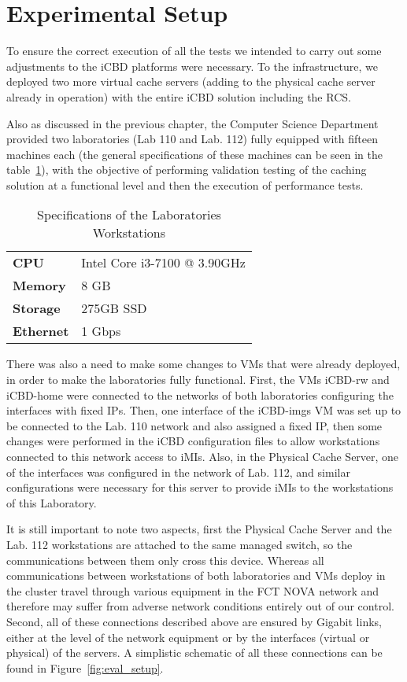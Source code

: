 \section{Experimental Setup}
\label{sec:eval_exp_setup}

To ensure the correct execution of all the tests we intended to carry out some adjustments to the iCBD platforms were necessary. To the infrastructure, we deployed two more virtual cache servers (adding to the physical cache server already in operation) with the entire iCBD solution including the RCS. 

Also as discussed in the previous chapter, the Computer Science Department provided two laboratories (Lab 110 and Lab. 112) fully equipped with fifteen machines each (the general specifications of these machines can be seen in the table~\ref{tab:exp_lab_work}), with the objective of performing validation testing of the caching solution at a functional level and then the execution of performance tests.

\begin{table}[]
\centering
\begin{tabular}{ll}
\textbf{CPU} & Intel Core i3-7100 @ 3.90GHz \\
\textbf{Memory} & 8 GB \\
\textbf{Storage} & 275GB SSD \\
\textbf{Ethernet} & 1 Gbps
\end{tabular}
\caption{Specifications of the Laboratories Workstations}
\label{tab:exp_lab_work}
\end{table}

There was also a need to make some changes to VMs that were already deployed, in order to make the laboratories fully functional. First, the VMs iCBD-rw and iCBD-home were connected to the networks of both laboratories configuring the interfaces with fixed IPs. Then, one interface of the iCBD-imgs VM was set up to be connected to the Lab. 110 network and also assigned a fixed IP, then some changes were performed in the iCBD configuration files to allow workstations connected to this network access to iMIs. Also, in the Physical Cache Server, one of the interfaces was configured in the network of Lab. 112, and similar configurations were necessary for this server to provide iMIs to the workstations of this Laboratory.

It is still important to note two aspects, first the Physical Cache Server and the Lab. 112 workstations are attached to the same managed switch, so the communications between them only cross this device. Whereas all communications between workstations of both laboratories and VMs deploy in the cluster travel through various equipment in the FCT NOVA network and therefore may suffer from adverse network conditions entirely out of our control. Second, all of these connections described above are ensured by Gigabit links, either at the level of the network equipment or by the interfaces (virtual or physical) of the servers. A simplistic schematic of all these connections can be found in Figure~\ref{fig:eval_setup}.

